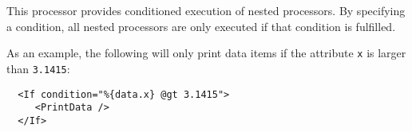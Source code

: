 
This processor provides conditioned execution of nested processors. By
specifying a condition, all nested processors are only executed if that
condition is fulfilled.

As an example, the following will only print data items if the attribute
\texttt{x} is larger than \texttt{3.1415}:

\begin{verbatim}
  <If condition="%{data.x} @gt 3.1415">
     <PrintData />
  </If>
\end{verbatim}


\begin{table}[h]
\end{table}
